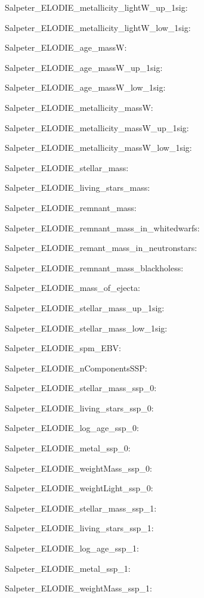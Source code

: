 \item Salpeter\_ELODIE\_metallicity\_lightW\_up\_1sig: 
\item Salpeter\_ELODIE\_metallicity\_lightW\_low\_1sig: 
\item Salpeter\_ELODIE\_age\_massW: 
\item Salpeter\_ELODIE\_age\_massW\_up\_1sig: 
\item Salpeter\_ELODIE\_age\_massW\_low\_1sig: 
\item Salpeter\_ELODIE\_metallicity\_massW: 
\item Salpeter\_ELODIE\_metallicity\_massW\_up\_1sig: 
\item Salpeter\_ELODIE\_metallicity\_massW\_low\_1sig: 
\item Salpeter\_ELODIE\_stellar\_mass: 
\item Salpeter\_ELODIE\_living\_stars\_mass: 
\item Salpeter\_ELODIE\_remnant\_mass: 
\item Salpeter\_ELODIE\_remnant\_mass\_in\_whitedwarfs: 
\item Salpeter\_ELODIE\_remant\_mass\_in\_neutronstars: 
\item Salpeter\_ELODIE\_remnant\_mass\_blackholess: 
\item Salpeter\_ELODIE\_mass\_of\_ejecta: 
\item Salpeter\_ELODIE\_stellar\_mass\_up\_1sig: 
\item Salpeter\_ELODIE\_stellar\_mass\_low\_1sig: 
\item Salpeter\_ELODIE\_spm\_EBV: 
\item Salpeter\_ELODIE\_nComponentsSSP: 
\item Salpeter\_ELODIE\_stellar\_mass\_ssp\_0: 
\item Salpeter\_ELODIE\_living\_stars\_ssp\_0: 
\item Salpeter\_ELODIE\_log\_age\_ssp\_0: 
\item Salpeter\_ELODIE\_metal\_ssp\_0: 
\item Salpeter\_ELODIE\_weightMass\_ssp\_0: 
\item Salpeter\_ELODIE\_weightLight\_ssp\_0: 
\item Salpeter\_ELODIE\_stellar\_mass\_ssp\_1: 
\item Salpeter\_ELODIE\_living\_stars\_ssp\_1: 
\item Salpeter\_ELODIE\_log\_age\_ssp\_1: 
\item Salpeter\_ELODIE\_metal\_ssp\_1: 
\item Salpeter\_ELODIE\_weightMass\_ssp\_1: 
